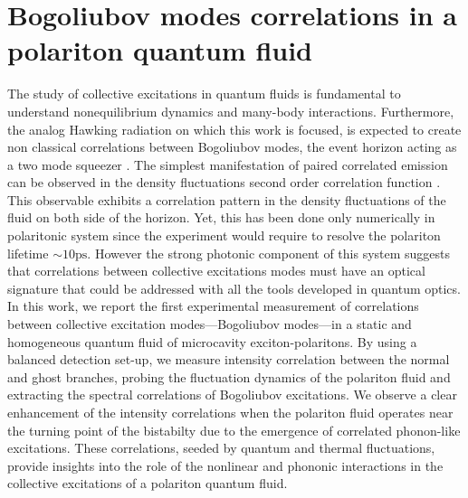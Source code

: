 

\newcommand{\hf}{\hat{f}}
\newcommand{\hX}{\hat{X}}
\newcommand{\hY}{\hat{Y}}

\graphicspath{{./}{./fig/}{./chap_correlation/fig/}}

\chapter{Bogoliubov modes correlations in a polariton quantum fluid}

\label{chap:correlation}

The study of collective excitations in quantum fluids is fundamental to understand nonequilibrium dynamics and many-body interactions. Furthermore, the analog Hawking radiation
on which this work is focused, is expected to create non classical correlations between Bogoliubov modes, the event horizon acting as a two mode squeezer \cite{agullo_symplectic_2022}. The simplest manifestation
of paired correlated emission can be observed in the density fluctuations second order correlation function \cite{nguyen_acoustic_2015, carusotto_stimulatedfluid_2016,jacquet_quantum_2023,steinhauer_observation_2016}.
This observable exhibits a correlation pattern in the density fluctuations of the fluid on both side of the horizon.
Yet, this has been done only numerically in polaritonic system since the experiment would require to resolve the polariton lifetime $\sim 10 \mathrm{ps}$. However 
the strong photonic component of this system suggests that correlations between collective excitations modes must have an optical signature that could be addressed
with all the tools developed in quantum optics.
In this work, we report the first experimental measurement of correlations between collective excitation modes—Bogoliubov modes—in a static and homogeneous quantum fluid of microcavity exciton-polaritons.
 By using a balanced detection set-up, we measure intensity correlation between the normal and ghost branches, probing the fluctuation dynamics of the polariton fluid and extracting the spectral correlations of Bogoliubov excitations.
  We observe a clear enhancement of the intensity correlations when the polariton fluid operates near the turning point of the bistabilty due to the emergence of correlated phonon-like excitations. These correlations, seeded by quantum and thermal fluctuations, provide insights into the role of the nonlinear and phononic interactions in the collective excitations of a polariton quantum fluid.

